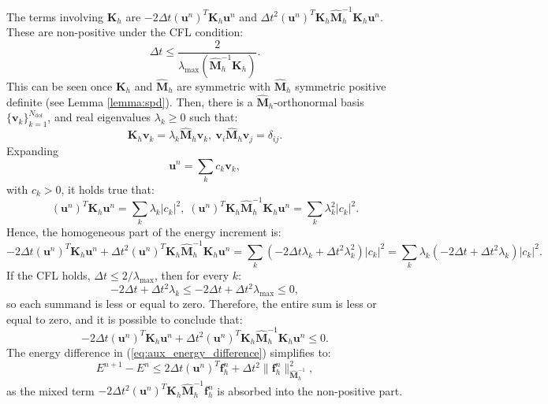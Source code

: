 \documentclass{article}
\renewcommand{\u}{\mathbf{u}}
\newcommand{\K}{\mathbf{K}_h}
\newcommand{\M}{\hat{\mathbf{M}}_h}
\begin{document}
The terms involving $\K$ are $-2 \Delta t (\u^n)^T \K \u^n$ and $\Delta t^2 (\u^n)^T \K \M^{-1} \K \u^n$. These are non-positive under the CFL condition:
\begin{equation}
    \nonumber
    \Delta t \leq \frac{2}{\lambda_{\max}\left( \M^{-1} \K \right)}.
\end{equation}
This can be seen once $\K$ and $\M$ are symmetric with $\M$ symmetric positive definite (see Lemma \ref{lemma:spd}). Then, there is a $\M$-orthonormal basis $\{ \mathbf{v}_k \}_{k=1}^{N_{\text{dof}}}$, and real eigenvalues $\lambda_k \geq 0$ such that:
\begin{equation}
    \nonumber
    \K \mathbf{v}_k = \lambda_k \M \mathbf{v}_k, \: \mathbf{v}_i \M \mathbf{v}_j = \delta_{ij}.
\end{equation}
Expanding
\begin{equation}
    \nonumber
    \u^n = \sum \limits_k c_k \mathbf{v}_k,
\end{equation}
with $c_k > 0$, it holds true that:
\begin{equation}
    \nonumber
    (\u^n)^T \K \u^n = \sum \limits_k \lambda_k |c_k|^2, \; (\u^n)^T \K \M^{-1} \K \u^n = \sum \limits_k \lambda_k^2 |c_k|^2.
\end{equation}
Hence, the homogeneous part of the energy increment is:
\begin{equation}
    \nonumber
    -2 \Delta t (\u^n)^T \K \u^n + \Delta t^2 (\u^n)^T \K \M^{-1} \K \u^n = \sum \limits_k (-2 \Delta t \lambda_k + \Delta t^2 \lambda_k^2)|c_k|^2 = \sum \limits_k \lambda_k  (-2 \Delta t  + \Delta t^2 \lambda_k)|c_k|^2.
\end{equation}
If the CFL holds, $\Delta t \leq 2/\lambda_{\max}$, then for every $k$:
\begin{equation}
    \nonumber
    -2 \Delta t + \Delta t^2 \lambda_k \leq -2 \Delta t + \Delta t^2 \lambda_{\max} \leq 0,
\end{equation}
so each summand is less or equal to zero. Therefore, the entire sum is less or equal to zero, and it is possible to conclude that:
\begin{equation}
    \nonumber
    -2 \Delta t (\u^n)^T \K \u^n + \Delta t^2 (\u^n)^T \K \M^{-1} \K \u^n \leq 0.
\end{equation}
The energy difference in (\ref{eq:aux_energy_difference}) simplifies to:
\begin{equation}\label{eq:aux_energy_difference_ineq}
    E^{n+1} - E^n \leq 2 \Delta t (\u^n)^T \mathbf{f}^n_h + \Delta t^2 \| \mathbf{f}^n_h \|^2_{\M^{-1}},
\end{equation}
as the mixed term $-2\Delta t^2 (\u^n)^T \K \M^{-1} \mathbf{f}^n_h$ is absorbed into the non-positive part. 
\end{document}
